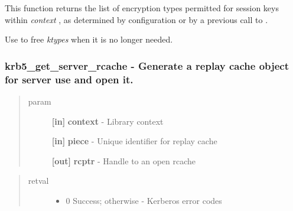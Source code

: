 \documentclass[letterpaper,10pt,english]{sphinxmanual}
\begin{document}
This function returns the list of encryption types permitted for session keys within \emph{context} , as determined by configuration or by a previous call to {\hyperref[appdev/refs/api/krb5_set_default_tgs_enctypes:c.krb5_set_default_tgs_enctypes]{}} .

Use {\hyperref[appdev/refs/api/krb5_free_enctypes:c.krb5_free_enctypes]{}} to free \emph{ktypes} when it is no longer needed.


\subsubsection{krb5\_get\_server\_rcache -  Generate a replay cache object for server use and open it.}
\label{appdev/refs/api/krb5_get_server_rcache:krb5-get-server-rcache-generate-a-replay-cache-object-for-server-use-and-open-it}\label{appdev/refs/api/krb5_get_server_rcache::doc}

\begin{fulllineitems}
\label{appdev/refs/api/krb5_get_server_rcache:c.krb5_get_server_rcache}
\end{fulllineitems}

\begin{quote}\begin{description}
\item[{param}] \leavevmode
\textbf{{[}in{]}} \textbf{context} - Library context

\textbf{{[}in{]}} \textbf{piece} - Unique identifier for replay cache

\textbf{{[}out{]}} \textbf{rcptr} - Handle to an open rcache

\end{description}\end{quote}
\begin{quote}\begin{description}
\item[{retval}] \leavevmode\begin{itemize}
\item {} 
0   Success; otherwise - Kerberos error codes

\end{itemize}

\end{description}\end{quote}
\end{document}
